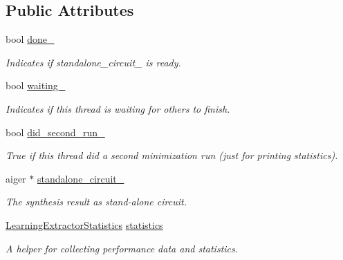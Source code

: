 \subsection*{Public Attributes}
\begin{DoxyCompactItemize}
\item 
bool \hyperlink{classParExtractorWorker_a460487c299f8c86e745a940278d38ee0}{done\-\_\-}
\begin{DoxyCompactList}\small\item\em Indicates if standalone\-\_\-circuit\-\_\- is ready. \end{DoxyCompactList}\item 
bool \hyperlink{classParExtractorWorker_aad63a07af4e70719e53a4c41d67b6dd1}{waiting\-\_\-}
\begin{DoxyCompactList}\small\item\em Indicates if this thread is waiting for others to finish. \end{DoxyCompactList}\item 
bool \hyperlink{classParExtractorWorker_a99552e89edf3a3925430399207a1b13e}{did\-\_\-second\-\_\-run\-\_\-}
\begin{DoxyCompactList}\small\item\em True if this thread did a second minimization run (just for printing statistics). \end{DoxyCompactList}\item 
aiger $\ast$ \hyperlink{classParExtractorWorker_a233a7f99946695b0640e76ead6932fbb}{standalone\-\_\-circuit\-\_\-}
\begin{DoxyCompactList}\small\item\em The synthesis result as stand-\/alone circuit. \end{DoxyCompactList}\item 
\hyperlink{classLearningExtractorStatistics}{Learning\-Extractor\-Statistics} \hyperlink{classParExtractorWorker_a5e23f373a7959b56eb6f93036f98a1b1}{statistics}
\begin{DoxyCompactList}\small\item\em A helper for collecting performance data and statistics. \end{DoxyCompactList}\end{DoxyCompactItemize}
